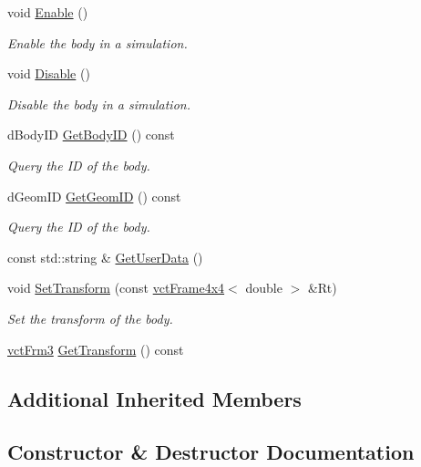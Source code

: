 \begin{DoxyCompactItemize}
void \hyperlink{classosa_o_d_e_body_ada9f6d67c4d6e4458db6db0ccb02c290}{Enable} ()
\begin{DoxyCompactList}\small\item\em Enable the body in a simulation. \end{DoxyCompactList}\item 
void \hyperlink{classosa_o_d_e_body_ab1a65c0f8bceb729273ae5f7f1d747a4}{Disable} ()
\begin{DoxyCompactList}\small\item\em Disable the body in a simulation. \end{DoxyCompactList}\item 
d\+Body\+I\+D \hyperlink{classosa_o_d_e_body_ac268b256773cf24b67c1db8213013d07}{Get\+Body\+I\+D} () const 
\begin{DoxyCompactList}\small\item\em Query the I\+D of the body. \end{DoxyCompactList}\item 
d\+Geom\+I\+D \hyperlink{classosa_o_d_e_body_ac17275bff032b8e6ba2de166dacdef0a}{Get\+Geom\+I\+D} () const 
\begin{DoxyCompactList}\small\item\em Query the I\+D of the body. \end{DoxyCompactList}\item 
const std\+::string \& \hyperlink{classosa_o_d_e_body_a44652743974777f38f508689b3e58873}{Get\+User\+Data} ()
\item 
void \hyperlink{classosa_o_d_e_body_a5b25e3f15c09f6bf7c937f791fbd9b43}{Set\+Transform} (const \hyperlink{classvct_frame4x4}{vct\+Frame4x4}$<$ double $>$ \&Rt)
\begin{DoxyCompactList}\small\item\em Set the transform of the body. \end{DoxyCompactList}\item 
\hyperlink{vct_transformation_types_8h_a81feda0a02c2d1bc26e5553f409fed20}{vct\+Frm3} \hyperlink{classosa_o_d_e_body_ae3f83f9ecdcd335e2f3a37e0a32167a1}{Get\+Transform} () const 
\end{DoxyCompactItemize}
\subsection*{Additional Inherited Members}


\subsection{Constructor \& Destructor Documentation}
\hypertarget{classosa_o_d_e_body_a80ecbd3ff62439edbd5d889975637db0}{}
